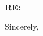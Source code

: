 \documentclass[letterpaper,11pt]{article}
\begin{document}
\begin{center}
  {\LARGE\bfseries \LetterName}\\[3pt]
  {\small \LetterContact}
\end{center}
\vspace{14pt}
\LetterDate\par
\vspace{7pt}
\textbf{RE: \LetterSubject}\par
\vspace{7pt}
\LetterGreeting\par
\LetterBody\par
\vspace{6pt}
Sincerely,\par
\vspace{8pt}
\LetterSignature
\end{document}
